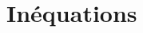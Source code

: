 \chapter{Inéquations}\label{ChInequations}

\exercicesbase
\begin{colonne*exercice}

\end{colonne*exercice}

\connaissances
%

\pagebreak



